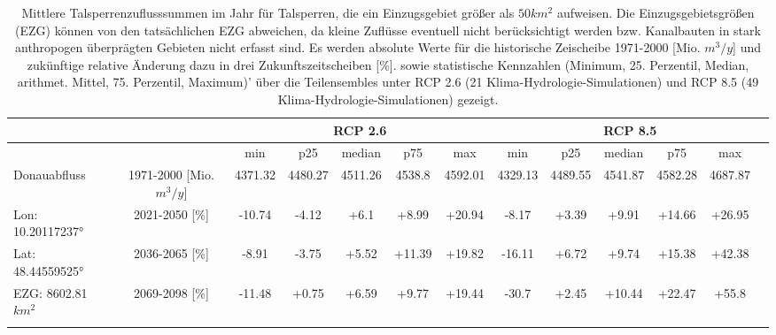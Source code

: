\renewcommand{\arraystretch}{1.2}
\addtolength{\tabcolsep}{-5.9pt}
\scriptsize
\begin{longtable}{@{\extracolsep{\fill}}lc|ccccc||cccccc}
\caption{Mittlere Talsperrenzuflusssummen im Jahr für Talsperren, die ein Einzugsgebiet größer als $50 km^2$ aufweisen. Die Einzugsgebietsgrößen (EZG) können von den tatsächlichen EZG abweichen, da kleine Zuflüsse eventuell nicht berücksichtigt werden bzw. Kanalbauten in stark anthropogen überprägten Gebieten nicht erfasst sind. Es werden absolute Werte für die historische Zeischeibe 1971-2000 [Mio. $m^3/y$] und zukünftige relative Änderung dazu in drei Zukunftszeitscheiben [\%]. sowie statistische Kennzahlen (Minimum, 25. Perzentil, Median, arithmet. Mittel, 75. Perzentil, Maximum)' über die Teilensembles unter RCP 2.6 (21 Klima-Hydrologie-Simulationen) und RCP 8.5 (49 Klima-Hydrologie-Simulationen) gezeigt.}\\  \hline
\multicolumn{2}{c}{} & \multicolumn{5}{c||}{RCP 2.6}  & \multicolumn{6}{c}{RCP 8.5}\\ \hline
\multicolumn{2}{c|}{} & min & p25 & median & p75 & max & min & p25 & median & p75 & max\\ 
\hline 
Donauabfluss & 1971-2000 [Mio. $m^3/y$]  & 4371.32 & 4480.27 & 4511.26 & 4538.8 & 4592.01 & 4329.13 & 4489.55 & 4541.87 & 4582.28 & 4687.87 & \\ 
\cline{2-13} 
Lon: 10.20117237° & 2021-2050 [\%]  & -10.74 & -4.12 & +6.1 & +8.99 & +20.94 & -8.17 & +3.39 & +9.91 & +14.66 & +26.95 & \\ 
Lat: 48.44559525° & 2036-2065 [\%]  & -8.91 & -3.75 & +5.52 & +11.39 & +19.82 & -16.11 & +6.72 & +9.74 & +15.38 & +42.38 & \\ 
EZG: 8602.81 $km^2$ & 2069-2098 [\%]  & -11.48 & +0.75 & +6.59 & +9.77 & +19.44 & -30.7 & +2.45 & +10.44 & +22.47 & +55.8 & \\\hline
\label{Qrouted_daily_sum_Talsperrenforlatex}
\end{longtable}
\addtolength{\tabcolsep}{5.9pt}
